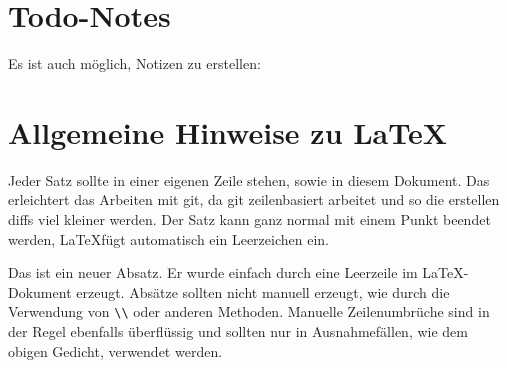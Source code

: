 \documentclass{iwi}
\begin{document}
\section{Todo-Notes}

Es ist auch möglich, Notizen zu erstellen:


\section{Allgemeine Hinweise zu \LaTeX}

Jeder Satz sollte in einer eigenen Zeile stehen, sowie in diesem Dokument.
Das erleichtert das Arbeiten mit git, da git zeilenbasiert arbeitet und so die erstellen diffs viel kleiner werden.
Der Satz kann ganz normal mit einem Punkt beendet werden, \LaTeX fügt automatisch ein Leerzeichen ein.

Das ist ein neuer Absatz.
Er wurde einfach durch eine Leerzeile im \LaTeX-Dokument erzeugt.
Absätze sollten nicht manuell erzeugt, wie durch die Verwendung von \lstinline!\\!  oder anderen Methoden.
Manuelle Zeilenumbrüche sind in der Regel ebenfalls überflüssig und sollten nur in Ausnahmefällen, wie dem obigen Gedicht, verwendet werden.

\clearpage
\newpage
 	\appendix
	\setcounter{page}{\value{frontpages}}
	
	\printbibliography[heading=bibintoc]

	
\end{document}
